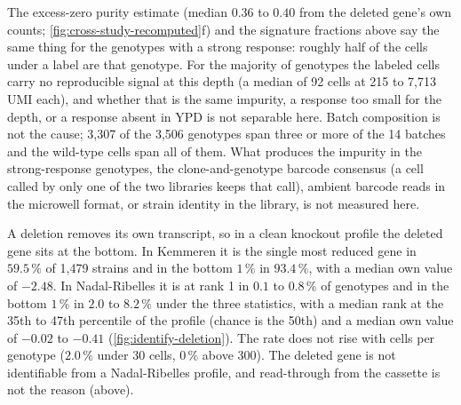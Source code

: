 The excess-zero purity estimate (median $0.36$ to $0.40$ from the deleted gene's own
counts; \cref{fig:cross-study-recomputed}f) and the signature fractions above say the
same thing for the genotypes with a strong response: roughly half of the cells under a
label are that genotype. For the majority of genotypes the labeled cells carry no
reproducible signal at this depth (a median of 92 cells at 215 to 7{,}713 UMI each), and
whether that is the same impurity, a response too small for the depth, or a response
absent in YPD is not separable here. Batch composition is not the cause; 3{,}307 of the
3{,}506 genotypes span three or more of the 14 batches and the wild-type cells span all
of them. What produces the impurity in the strong-response genotypes, the
clone-and-genotype barcode consensus (a cell called by only one of the two libraries
keeps that call), ambient barcode reads in the microwell format, or strain identity in
the library, is not measured here.

 A deletion removes its own
transcript, so in a clean knockout profile the deleted gene sits at the bottom. In
Kemmeren it is the single most reduced gene in $59.5\,\%$ of 1{,}479 strains and in the
bottom $1\,\%$ in $93.4\,\%$, with a median own value of $-2.48$. In Nadal-Ribelles it
is at rank 1 in $0.1$ to $0.8\,\%$ of genotypes and in the bottom $1\,\%$ in $2.0$ to
$8.2\,\%$ under the three statistics, with a median rank at the 35th to 47th percentile
of the profile (chance is the 50th) and a median own value of $-0.02$ to $-0.41$
(\cref{fig:identify-deletion}). The rate does not rise with cells per genotype
($2.0\,\%$ under 30 cells, $0\,\%$ above 300). The deleted gene is not identifiable
from a Nadal-Ribelles profile, and read-through from the cassette is not the reason (above).

